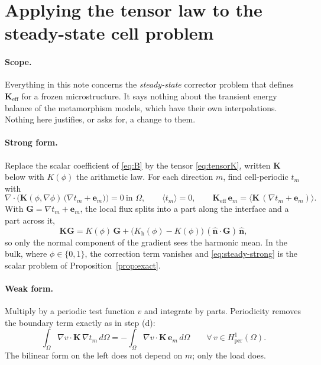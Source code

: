 \documentclass[11pt]{article}
\newcommand{\Om}{\Omega}
\newcommand{\bn}{\hat{\mathbf n}}
\newcommand{\be}{\mathbf e}
\newcommand{\Keff}{\mathbf{K}_{\mathrm{eff}}}
\newcommand{\Hper}{H^1_{\mathrm{per}}(\Om)}
\newcommand{\avg}[1]{\big\langle #1 \big\rangle}
\begin{document}
\section{Applying the tensor law to the steady-state cell problem}
\label{sec:steady}

\paragraph{Scope.} Everything in this note concerns the \emph{steady-state}
corrector problem that defines $\Keff$ for a frozen microstructure. It says
nothing about the transient energy balance of the metamorphism models, which
have their own interpolations. Nothing here justifies, or asks for, a change to
them.

\paragraph{Strong form.} Replace the scalar coefficient of \eqref{eq:B} by the
tensor \eqref{eq:tensorK}, written $\mathbf K$ below with $K(\phi)$ the
arithmetic law. For each direction $m$, find cell-periodic $t_m$ with
\begin{equation}
\nabla\!\cdot\!\Big(\mathbf K(\phi,\nabla\phi)\,\big(\nabla t_m+\be_m\big)\Big)=0
\ \text{in }\Om,
\qquad \avg{t_m}=0,
\qquad
\Keff\,\be_m=\avg{\mathbf K\,(\nabla t_m+\be_m)} .
\label{eq:steady-strong}
\end{equation}
With $\mathbf G=\nabla t_m+\be_m$, the local flux splits into a part along the
interface and a part across it,
\begin{equation}
\mathbf K\mathbf G=K(\phi)\,\mathbf G
+\big(K_{\mathrm h}(\phi)-K(\phi)\big)\,(\bn\cdot\mathbf G)\,\bn ,
\label{eq:flux-split}
\end{equation}
so only the normal component of the gradient sees the harmonic mean. In the bulk,
where $\phi\in\{0,1\}$, the correction term vanishes and
\eqref{eq:steady-strong} is the scalar problem of Proposition~\ref{prop:exact}.

\paragraph{Weak form.} Multiply by a periodic test function $v$ and integrate
by parts. Periodicity removes the boundary term exactly as in step (d):
\begin{equation}
\int_\Om\nabla v\cdot\mathbf K\,\nabla t_m\,d\Om
=-\int_\Om\nabla v\cdot\mathbf K\,\be_m\,d\Om
\qquad\forall\,v\in\Hper .
\label{eq:steady-weak}
\end{equation}
The bilinear form on the left does not depend on $m$; only the load does.
\end{document}
